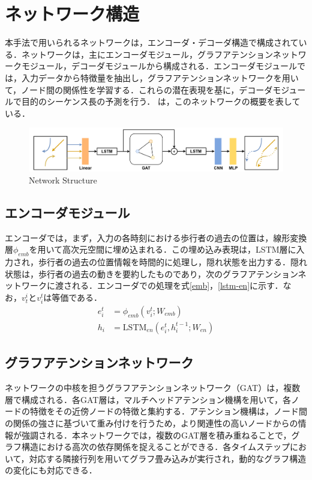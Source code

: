 \section{ネットワーク構造}
本手法で用いられるネットワークは，エンコーダ・デコーダ構造で構成されている．ネットワークは，主にエンコーダモジュール，グラフアテンションネットワークモジュール，デコーダモジュールから構成される．エンコーダモジュールでは，入力データから特徴量を抽出し，グラフアテンションネットワークを用いて，ノード間の関係性を学習する．これらの潜在表現を基に，デコーダモジュールで目的のシーケンス長の予測を行う．
は，このネットワークの概要を表している．

\begin{figure}[hbtp]
  \centering
 \includegraphics[keepaspectratio, scale=0.36]
      {images/network-comp.pdf}
 \caption{Network Structure}
 \label{Fig:network}
\end{figure}   

\subsection{エンコーダモジュール}
エンコーダでは，まず，入力の各時刻における歩行者の過去の位置は，線形変換層$\phi_{emb}$を用いて高次元空間に埋め込まれる．この埋め込み表現は，LSTM層に入力され，歩行者の過去の位置情報を時間的に処理し，隠れ状態を出力する．隠れ状態は，歩行者の過去の動きを要約したものであり，次のグラフアテンションネットワークに渡される．エンコーダでの処理を式\eqref{emb}，\eqref{lstm-en}に示す．なお，$v^i_t \text{と} v^t_i$は等価である．
\begin{align}
  e^t_i &= \phi_{emb}(v^t_i ; W_{emb}) \label{emb} \\
  h_i &= \text{LSTM}_{en}(e^t_i, h^{t-1}_i ; W_{en}) \label{lstm-en}
\end{align}

\subsection{グラフアテンションネットワーク}
ネットワークの中核を担うグラフアテンションネットワーク（GAT）\cite{velickovic2017graph-gat}は，複数層で構成される．各GAT層は，マルチヘッドアテンション機構を用いて，各ノードの特徴をその近傍ノードの特徴と集約する．アテンション機構は，ノード間の関係の強さに基づいて重み付けを行うため，より関連性の高いノードからの情報が強調される．本ネットワークでは，複数のGAT層を積み重ねることで，グラフ構造における高次の依存関係を捉えることができる．各タイムステップにおいて，対応する隣接行列を用いてグラフ畳み込みが実行され，動的なグラフ構造の変化にも対応できる．

